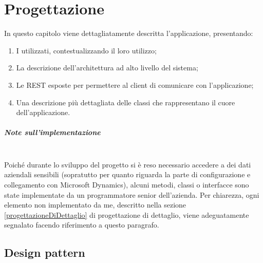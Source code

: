 \documentclass[12pt,a4paper,twoside,openany,english]{book}
\begin{document}
\chapter{Progettazione}\label{progettazione}
In questo capitolo viene dettagliatamente descritta l'applicazione, presentando: 
\begin{enumerate}
	\itemsep-0.5em
	\item I  utilizzati, contestualizzando il loro utilizzo;
	\item La descrizione dell'architettura ad alto livello del sistema;
	\item Le  REST esposte per permettere al client di comunicare con l'applicazione;
	\item Una descrizione più dettagliata delle classi che rappresentano il cuore dell'applicazione.
\end{enumerate}

\paragraph{Note sull'implementazione}\label{noteImplementazione}~\\
Poiché durante lo sviluppo del progetto si è reso necessario accedere a dei dati aziendali sensibili (sopratutto per quanto riguarda la parte di configurazione e collegamento con Microsoft Dynamics), alcuni metodi, classi o interfacce sono state implementate da un programmatore senior dell'azienda. Per chiarezza, ogni elemento non implementato da me, descritto nella sezione \ref{progettazioneDiDettaglio} di progettazione di dettaglio, viene adeguatamente segnalato facendo riferimento a questo paragrafo.
\par

\section{Design pattern}\label{design_pattern}
\end{document}
